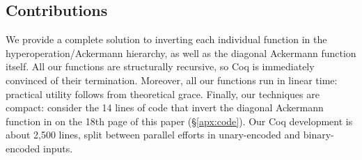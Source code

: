 \subsection{Contributions}
We provide a complete solution to inverting each individual function in the hyperoperation/Ackermann hierarchy,
as well as the diagonal Ackermann function itself.  All our functions are structurally recursive, so
Coq is immediately convinced of their termination.  Moreover, all our functions run in linear time: practical utility follows from theoretical grace.
Finally, our techniques are compact: consider the 14 lines of code that invert the diagonal Ackermann function in  on the 18th page of this paper (\S\ref{apx:code}).  Our Coq development is about 2,500 lines, split between parallel efforts in unary-encoded and binary-encoded inputs.
